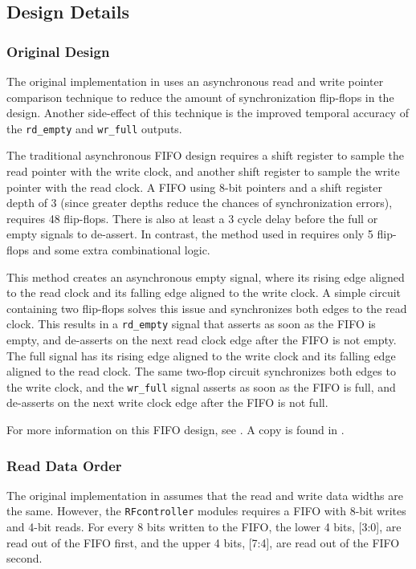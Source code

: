 \subsection{Design Details}
\subsubsection{Original Design}
The original implementation in \cite{async-fifo} uses an asynchronous read and write pointer comparison technique to reduce the amount of synchronization flip-flops in the design. Another side-effect of this technique is the improved temporal accuracy of the \texttt{rd\_empty} and \texttt{wr\_full} outputs.

The traditional asynchronous FIFO design requires a shift register to sample the read pointer with the write clock, and another shift register to sample the write pointer with the read clock. A FIFO using 8-bit pointers and a shift register depth of 3 (since greater depths reduce the chances of synchronization errors), requires 48 flip-flops. There is also at least a 3 cycle delay before the full or empty signals to de-assert. In contrast, the method used in \cite{async-fifo} requires only 5 flip-flops and some extra combinational logic.

This method creates an asynchronous empty signal, where its rising edge aligned to the read clock and its falling edge aligned to the write clock. A simple circuit containing two flip-flops solves this issue and synchronizes both edges to the read clock. This results in a \texttt{rd\_empty} signal that asserts as soon as the FIFO is empty, and de-asserts on the next read clock edge after the FIFO is not empty. The full signal has its rising edge aligned to the write clock and its falling edge aligned to the read clock. The same two-flop circuit synchronizes both edges to the write clock, and the \texttt{wr\_full} signal asserts as soon as the FIFO is full, and de-asserts on the next write clock edge after the FIFO is not full.

For more information on this FIFO design, see \cite{async-fifo}. A copy is found in .

\subsubsection{Read Data Order}
The original implementation in \cite{async-fifo} assumes that the read and write data widths are the same. However, the \texttt{RFcontroller} modules requires a FIFO with 8-bit writes and 4-bit reads. For every 8 bits written to the FIFO, the lower 4 bits, [3:0], are read out of the FIFO first, and the upper 4 bits, [7:4], are read out of the FIFO second.

